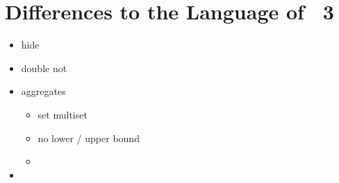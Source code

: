 \section{Differences to the Language of \gringo~3}\label{sec:gringo:tri}
\tbf

\begin{itemize}
\item hide
\item double not
\item aggregates
  \begin{itemize}
  \item set multiset
  \item no lower / upper bound
  \item {} 
  \end{itemize}
\item 
\end{itemize}

